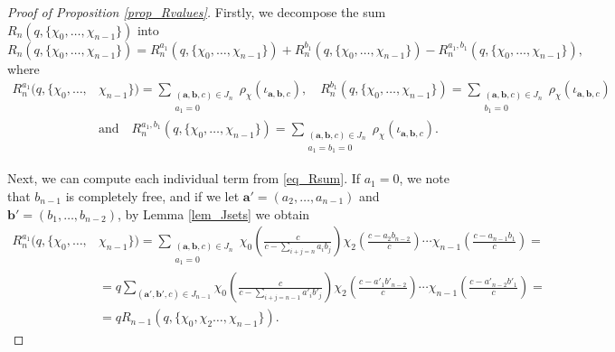     \begin{proof}[Proof of Proposition \ref{prop_Rvalues}]
        Firstly, we decompose the sum $R_n(q,\{\chi_0,\ldots,\chi_{n-1}\})$ into
        \begin{equation}\label{eq_Rsum}
            R_n(q,\{\chi_0,\ldots,\chi_{n-1}\})=R_n^{a_1}(q,\{\chi_0,\ldots,\chi_{n-1}\})+R_n^{b_1}(q,\{\chi_0,\ldots,\chi_{n-1}\})-R_n^{a_1,b_1}(q,\{\chi_0,\ldots,\chi_{n-1}\}),
        \end{equation}
        where
        \begin{align*}
            R_n^{a_1}(q,\{\chi_0,\ldots,&\chi_{n-1}\})=\sum_{\substack{(\mathbf{a},\mathbf{b},c)\in J_n\\ a_1=0}}\rho_\chi(\iota_{\mathbf{a},\mathbf{b},c}), \quad R_n^{b_1}(q,\{\chi_0,\ldots,\chi_{n-1}\})=\sum_{\substack{(\mathbf{a},\mathbf{b},c)\in J_n\\ b_1=0}}\rho_\chi(\iota_{\mathbf{a},\mathbf{b},c})\\
            &\text{and}\quad R_n^{a_1,b_1}(q,\{\chi_0,\ldots,\chi_{n-1}\})=\sum_{\substack{(\mathbf{a},\mathbf{b},c)\in J_n\\ a_1=b_1=0}}\rho_\chi(\iota_{\mathbf{a},\mathbf{b},c}).
        \end{align*}

        Next, we can compute each individual term from \eqref{eq_Rsum}. If $a_1=0$, we note that $b_{n-1}$ is completely free, and if we let $\mathbf{a}'=(a_2,\ldots,a_{n-1})$ and $\mathbf{b}'=(b_1,\ldots,b_{n-2})$, by Lemma \ref{lem_Jsets} we obtain
        \begin{align*}
            R_n^{a_1}(q,\{\chi_0,\ldots,&\chi_{n-1}\})=\sum_{\substack{(\mathbf{a},\mathbf{b},c)\in J_n\\ a_1=0}}\chi_0\left(\frac{c}{c-\sum_{i+j=n}a_ib_j}\right)\chi_2\left(\frac{c-a_2b_{n-2}}{c}\right)%
            \cdots\chi_{n-1}\left(\frac{c-a_{n-1}b_1}{c}\right)=\\
            &=q\sum_{(\mathbf{a}',\mathbf{b}',c)\in J_{n-1}}\chi_0\left(\frac{c}{c-\sum_{i+j=n-1}a'_ib'_j}\right)\chi_2\left(\frac{c-a'_1b'_{n-2}}{c}\right)%
            \cdots\chi_{n-1}\left(\frac{c-a'_{n-2}b'_1}{c}\right)=\\
            &=qR_{n-1}(q,\{\chi_0,\chi_2\ldots,\chi_{n-1}\}).
        \end{align*}


\end{proof}
